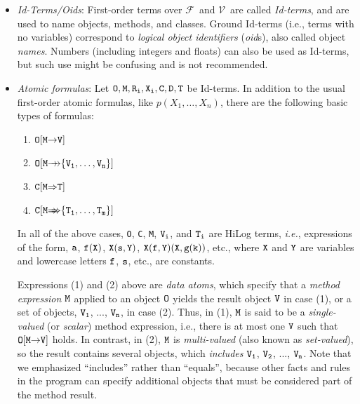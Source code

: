 \documentclass[11pt]{article}
\newcommand{\fd}{\ensuremath{{\rightarrow}}}                   %
\newcommand{\mvd}{\ensuremath{{\rightarrow\!\!\!\!\rightarrow}}}  %
\newcommand{\Fd}{\ensuremath{{\Rightarrow}}}                      %
\newcommand{\Mvd}{\ensuremath{{\Rightarrow\!\!\!\!\Rightarrow}}}  %
\newcommand{\fl}{\mbox{F-logic}\xspace}
\newcommand{\funcs}{\ensuremath{\mathcal{F}}}
\newcommand{\vars}{\ensuremath{\mathcal{V}}}
\begin{document}
\begin{itemize}
\item \emph{Id-Terms/Oids}:
    First-order terms over \funcs\ and \vars\ are called \emph{Id-terms},
    and are used to name objects, methods, and classes.  Ground Id-terms
    (i.e., terms with no variables) correspond to \emph{logical
      object identifiers} (\emph{oid}s), also called object \emph{names}.
    Numbers (including integers and floats) can also be used as Id-terms,
    but such use might be confusing and is not recommended.
  \index{atomic formula!in \fl}
\item \emph{Atomic formulas}: Let $\tt O,M,R_{i},X_{i},C,D,T$ be Id-terms.  In
  addition to the usual first-order atomic formulas, like
  $p(X_1,\dots,X_n)$, there are the following basic types of formulas:
  \medskip

  \begin{enumerate}
    \item \label{eq-scalar-atom} $\tt O[M\fd V]$
    \item $\tt O[M\mvd \{V_1,\dots,V_n\}]$
    \item $\tt C[M\Fd T]$
    \item $\tt C[M\Mvd \{T_1,\dots,T_m\}]$
  \end{enumerate}
  
  In all of the above cases, {\tt O}, {\tt C}, {\tt M}, ${\tt V_i}$, and
  ${\tt T_i}$ are HiLog terms, {\it i.e.}, expressions of the form, $\tt a$,
  $\tt f(X)$, $\tt X(s,Y)$, $\tt X(f,Y)(X,g(k))$, etc., where $\tt X$
  and $\tt Y$ are variables and lowercase letters $\tt f$, $\tt s$, etc., are
  constants.
  
  Expressions (1) and (2) above are \emph{data atoms}, which specify that a
  \emph{method expression} $\tt M$ applied to an object $\tt O$ yields the
  result object $\tt V$ in case (1), or a set of objects, $\tt V_1$, ...,
  $\tt V_n$, in case (2). Thus, in (1), $\tt M$ is said to be a
  \emph{single-valued} (or \emph{scalar}) method expression, i.e., there is
  at most one $\tt V$ such that $\tt O[M\fd V]$ holds.  In contrast, in
  (2), $\tt M$ is \emph{multi-valued} (also known as \emph{set-valued}), so
  the result contains several objects, which \emph{includes} $\tt V_1$,
  $\tt V_2$, ..., $\tt V_n$. Note that we emphasized ``includes'' rather
  than ``equals'', because other facts and rules in the program can specify
  additional objects that must be considered part of the method result.
  

\end{itemize}
\end{document}
